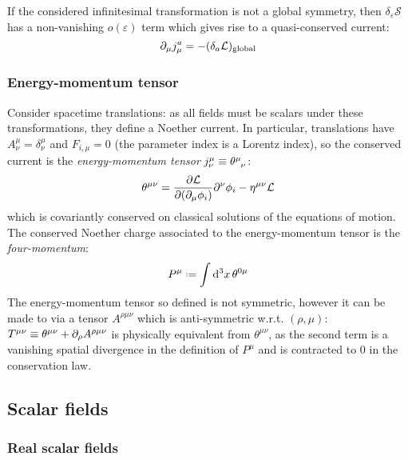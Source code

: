 If the considered infinitesimal transformation is not a global symmetry, then $ \delta_\varepsilon \mathcal{S} $ has a non-vanishing $ o(\varepsilon) $ term which gives rise to a quasi-conserved current:
\begin{equation}
  \partial_\mu j^a_\mu = - (\delta_a \mathcal{L})_\mathrm{global}
\end{equation}

\subsubsection{Energy-momentum tensor}

Consider spacetime translations: as all fields must be scalars under these transformations, they define a Noether current. In particular, translations have $ A^\mu_\nu = \delta^\mu_\nu $ and $ F_{i,\mu} = 0 $ (the parameter index is a Lorentz index), so the conserved current is the \textit{energy-momentum tensor} $ j^\mu_\nu \equiv \tensor{\theta}{^\mu_\nu} $:
\begin{equation}
  \theta^{\mu \nu} = \frac{\partial \mathcal{L}}{\partial (\partial_\mu \phi_i)} \partial^\nu \phi_i - \eta^{\mu \nu} \mathcal{L}
  \label{eq:en-mom-tensor}
\end{equation}
which is covariantly conserved on classical solutions of the equations of motion. The conserved Noether charge associated to the energy-momentum tensor is the \textit{four-momentum}:
\begin{equation}
  P^\mu \defeq \int \dd^3 x\, \theta^{0 \mu}
  \label{eq:4-mom-def}
\end{equation}
The energy-momentum tensor so defined is not symmetric, however it can be made to via a tensor $ A^{\rho \mu \nu} $ which is anti-symmetric w.r.t. $ (\rho,\mu) $: $ T^{\mu \nu} \equiv \theta^{\mu \nu} + \partial_\rho A^{\rho \mu \nu} $ is physically equivalent from $ \theta^{\mu \nu} $, as the second term is a vanishing spatial divergence in the definition of $ P^\mu $ and is contracted to 0 in the conservation law.

\subsection{Scalar fields}

\subsubsection{Real scalar fields}

